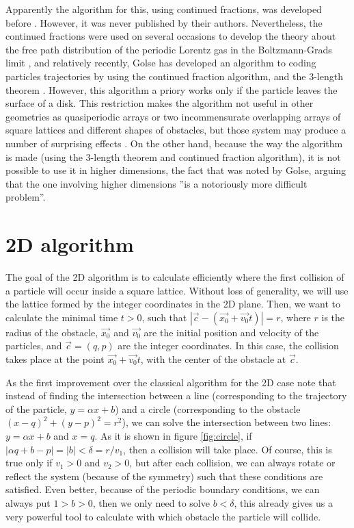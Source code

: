 \documentclass[prl,amsmath,amssymb, twocolumn, showpacs]{revtex4-1}
\begin{document}
Apparently the algorithm for this, using continued fractions, was developed before \cite{zacherl1986power}. However, it was never published by their authors. Nevertheless, the continued fractions were used on several occasions to develop the theory about the free path distribution of the periodic Lorentz gas in the Boltzmann-Grads limit \cite{caglioti2003distribution, golse2012recent,boca2007distribution,golse2006periodic,caglioti2008boltzmann, caglioti2010boltzmann, golse2000distribution, bleher1992statistical,chernov1994statistical}, and relatively recently, Golse has developed an algorithm to coding particles trajectories by using the continued fraction algorithm, and the 3-length theorem \cite{golse2012recent}. However, this algorithm a priory works only if the particle leaves the surface of a disk. This restriction makes the algorithm not useful in other geometries as quasiperiodic arrays or two incommensurate overlapping arrays of square lattices and different shapes of obstacles, but those system may produce a number of surprising effects \cite{}.  On the other hand, because the way the algorithm is made (using the 3-length theorem and continued fraction algorithm), it is not possible to use it in higher dimensions, the fact that was noted by Golse, arguing that the one involving higher dimensions ''is a notoriously more difficult problem''.

\section{2D algorithm}
\label{algorithm}

The goal of the 2D algorithm is to calculate efficiently where the first collision of a particle will occur inside a square lattice. Without loss of generality, we will use the lattice formed by the integer coordinates in the 2D plane. Then, we want to calculate the minimal time $t>0$, such that $|\vec{c}-(\vec{x_0}+\vec{v_0}t)|=r$, where $r$ is the radius of the obstacle, $\vec{x_0}$ and $\vec{v_0}$ are the initial position and velocity of the particles, and $\vec{c}=(q,p)$ are the integer coordinates. In this case, the collision takes place at the point $\vec{x_0}+\vec{v_0}t$, with the center of the obstacle at $\vec{c}$. 

As the first improvement over the classical algorithm for the 2D case note that instead of finding the intersection between a line (corresponding to the trajectory of the particle, $y=\alpha x+b$) and a circle (corresponding to the obstacle $(x-q)^2+(y-p)^2=r^2$), we can solve the intersection between two lines: $y=\alpha x+b$ and $x=q$. As it is shown in figure \ref{fig:circle}, if $|\alpha q+b-p|=|b|<\delta=r/v_1$, then a collision will take place. Of course, this is true only if $v_1>0$ and $v_2>0$, but after each collision, we can always rotate or reflect the system (because of the symmetry) such that these conditions are satisfied. Even better, because of the periodic boundary conditions, we can always put $1>b>0$, then we only need to solve $b<\delta$, this already gives us a very powerful tool to calculate with which obstacle the particle will collide. 
\end{document}
